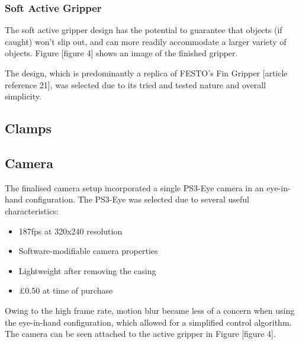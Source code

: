 \documentclass[conference]{IEEEtran}
\begin{document}
	\subsubsection{Soft Active Gripper}
	The soft active gripper design has the potential to guarantee that objects (if caught) won’t slip out, and can more readily accommodate a larger variety of objects. Figure [figure 4] shows an image of the finished gripper.
	
	The design, which is predominantly a replica of FESTO’s Fin Gripper [article reference 21], was selected due to its tried and tested nature and overall simplicity. 
	
	
	\subsection{Clamps}
	
	\subsection{Camera}\label{camera}
	The finalised camera setup incorporated a single PS3-Eye camera in an eye-in-hand configuration. The PS3-Eye was selected due to several useful characteristics:
	\begin{itemize}
		\item 187fps at 320x240 resolution
		
		\item Software-modifiable camera properties
		
		\item Lightweight after removing the casing
		
		\item \pounds0.50 at time of purchase
	\end{itemize}
	
	Owing to the high frame rate, motion blur became less of a concern when using the eye-in-hand configuration, which allowed for a simplified control algorithm. The camera can be seen attached to the active gripper in Figure [figure 4].
	
\end{document}

